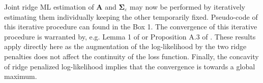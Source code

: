 Joint ridge ML estimation of $\mathbf{A}$ and $\mathbf{\Sigma}_{\varepsilon}$ may now be performed by iteratively estimating them individually keeping the other temporarily fixed. Pseudo-code of this iterative procedure can found in the Box 1. The convergence of this iterative procedure is warranted by, e.g. Lemma 1 of \cite{Oberhofer1974} or Proposition A.3 of \cite{Lauritzen1996}. These results apply directly here as the augmentation of the log-likelihood by the two ridge penalties does not affect the continuity of the loss function. Finally, the concavity of ridge penalized log-likelihood implies that the convergence is towards a global maximum.

\begin{minipage}[h]{\textwidth}
\begin{center}
\end{center}
\end{minipage}
\mbox{ }

